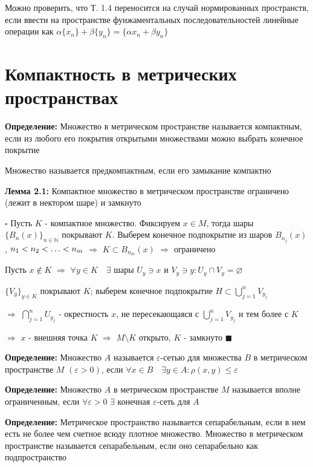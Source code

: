 \documentclass[a4paper]{report}
\newcommand*{\hm}[1]{#1\nobreak\discretionary{}%
            {\hbox{$\mathsurround=0pt #1$}}{}}
\begin{document}
Можно проверить, что Т. 1.4 переносится на случай нормированных пространств, если ввести на пространстве фунжаментальных 
последовательностей линейные операции как $\alpha\{x_n\}+\beta\{y_n\}=\{\alpha x_n+\beta y_n\}$








\chapter{Компактность в метрических пространствах}

\noindent\textbf{Определение:} Множество в метрическом пространстве называется компактным, если из любого его покрытия 
открытыми множествами можно выбрать конечное покрытие

Множество называется предкомпактным, если его замыкание компактно
\bigskip

\noindent\textbf{Лемма 2.1:} Компактное множество в метрическом пространстве ограничено (лежит в нектором шаре) и замкнуто

\noindent $\square$ Пусть $K$ - компактное множество. Фиксируем $x\in M$, тогда шары $\{B_n(x)\}_{n\in\mathbb N}$ 
покрывают $K$. Выберем конечное подпокрытие из шаров $B_{n_j}(x)$, $n_1<n_2\hm<\ldots<n_m$ $\Rightarrow$ $K\subset
B_{n_m}(x)$ $\Rightarrow$ ограничено

Пусть $x\notin K$ $\Rightarrow$ $\forall y\in K\quad\exists$ шары $U_y\ni x$ и $V_y\ni y\colon U_y\cap V_y=\varnothing$

$\{V_y\}_{y\in K}$ покрывают $K$; выберем конечное подпокрытие $H\subset\bigcup\limits_{j=1}^n V_{y_j}$ 

$\Rightarrow$
$\bigcap\limits_{j=1}^n U_{y_j}$ - окрестность $x$, не пересекающаяся с $\bigcup\limits_{j=1}^n V_{y_j}$ и тем более с $K$ 

$\Rightarrow$ $x$ - внешняя точка $K$ $\Rightarrow$ $M\setminus K$ открыто, $K$ - замкнуто $\blacksquare$
\bigskip

\noindent\textbf{Определение:} Множество $A$ называется $\varepsilon$-сетью для множества $B$ в метрическом пространстве 
$M$ $(\varepsilon>0)$, если $\forall x\in B\quad\exists y\in A\colon\rho(x,y)\le\varepsilon$
\bigskip

\noindent\textbf{Определение:} Множество $A$ в метрическом пространстве $M$ называется вполне ограниченным, если $\forall
\varepsilon>0$ $\exists$ конечная $\varepsilon$-сеть для $A$
\bigskip

\noindent\textbf{Определение:} Метрическое пространство называется сепарабельным, если в нем есть не более чем счетное 
всюду плотное множество. Множество в метрическом пространстве называется сепарабельным, если оно сепарабельно как 
подпространство
\bigskip
\end{document}
